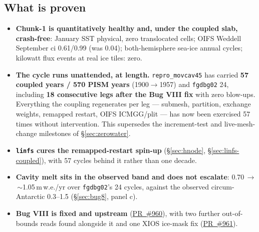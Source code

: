 \documentclass[11pt,a4paper]{article}
\newcommand{\code}[1]{\texttt{\small #1}}
\begin{document}
\subsection{What is proven}
\begin{itemize}
\item \textbf{Chunk-1 is quantitatively healthy and, under the coupled slab, crash-free}: January
  SST physical, zero translocated cells; OIFS Weddell September ci 0.61/0.99 (was 0.04);
  both-hemisphere sea-ice annual cycles; kilowatt flux events at real ice tiles: zero.
\item \textbf{The cycle runs unattended, at length.} \code{repro\_movcav45} has carried
  \textbf{57 coupled years / 570 PISM years} (1900$\to$1957) and \code{fgdbg02} 24, including
  \textbf{18 consecutive legs after the Bug VIII fix} with zero blow-ups. Everything the coupling
  regenerates per leg --- submesh, partition, exchange weights, remapped restart, OIFS ICMGG/plit
  --- has now been exercised 57 times without intervention. This supersedes the increment-test and
  live-mesh-change milestones of \S\ref{sec:zerowater}.
\item \textbf{\code{linfs} cures the remapped-restart spin-up} (\S\ref{sec:hnode},
  \S\ref{sec:linfs-coupled}), with 57 cycles behind it rather than one decade.
\item \textbf{Cavity melt sits in the observed band and does not escalate}:
  0.70\,$\to$\,$\sim$1.05\,m\,w.e./yr over \code{fgdbg02}'s 24 cycles, against the observed
  circum-Antarctic 0.3--1.5 (\S\ref{sec:bug8}, panel c).
\item \textbf{Bug VIII is fixed and upstream}
  (\href{https://github.com/FESOM/fesom2/pull/960}{PR~\#960}), with two further out-of-bounds reads
  found alongside it and one XIOS ice-mask fix
  (\href{https://github.com/FESOM/fesom2/pull/961}{PR~\#961}).
\end{itemize}
\end{document}
